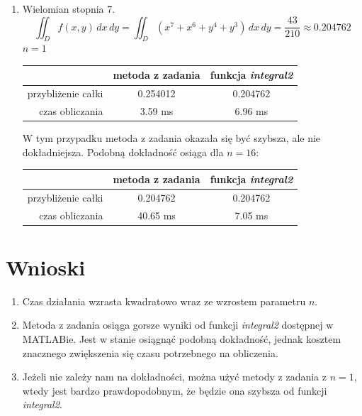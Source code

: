 \documentclass[12pt]{article}
\begin{document}
\begin{enumerate}[label=\textbf{Przykład \arabic*}]
	
	
		\item
		Wielomian stopnia 7.
		$$\iint_D f(x, y) \,dx\,dy = \iint_D (x^7 + x^6 + y^4 + y^3) \,dx\,dy = \frac{43}{210} \approx 0.204762$$
		$n = 1$
		
		\begin{table}[H]
			\centering
			\begin{tabular}{|r|c|c|}
				\hline
				                   & metoda z zadania & funkcja \textit{integral2} \\ \hline
				przybliżenie całki &     0.254012     & 0.204762                   \\ \hline
				   czas obliczania &     3.59 ms      & 6.96 ms                    \\ \hline
			\end{tabular}
		\end{table}
	
		W tym przypadku metoda z zadania okazała się być szybsza, ale nie dokładniejsza. Podobną dokładność osiąga dla $n = 16$:
		
		\begin{table}[H]
			\centering
			\begin{tabular}{|r|c|c|}
				\hline
				                   & metoda z zadania & funkcja \textit{integral2} \\ \hline
				przybliżenie całki &     0.204762     & 0.204762                   \\ \hline
				   czas obliczania &     40.65 ms     & 7.05 ms                    \\ \hline
			\end{tabular}
		\end{table}
		
	\end{enumerate}
	
	
	
	
	
	
	\section{Wnioski}
	\begin{enumerate}
		\item Czas działania wzrasta kwadratowo wraz ze wzrostem parametru $n$.
		
		\item Metoda z zadania osiąga gorsze wyniki od funkcji \textit{integral2} dostępnej w MATLABie. Jest w stanie osiągnąć podobną dokładność, jednak kosztem znacznego zwiększenia się czasu potrzebnego na obliczenia.
		
		\item Jeżeli nie zależy nam na dokładności, można użyć metody z zadania z $n = 1$, wtedy jest bardzo prawdopodobnym, że będzie ona szybsza od funkcji \textit{integral2}.
	\end{enumerate}
\end{document}
